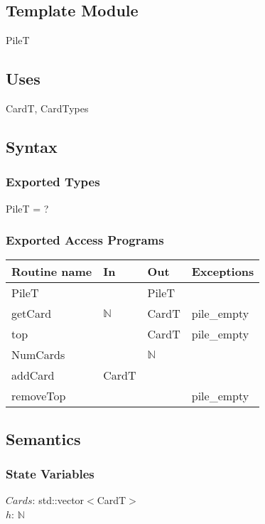 \documentclass[12pt]{article}
\begin{document}
\subsection*{Template Module}

PileT

\subsection* {Uses}

CardT, CardTypes

\subsection* {Syntax}

\subsubsection* {Exported Types}

PileT = ?

\subsubsection* {Exported Access Programs}

\begin{tabular}{| l | l | l | l |}
\hline
\textbf{Routine name} & \textbf{In} & \textbf{Out} & \textbf{Exceptions}\\
\hline
PileT & ~ & PileT & ~\\
\hline
getCard & $\mathbb{N}$ & CardT & pile\_empty\\
\hline
top & ~ & CardT & pile\_empty\\
\hline
NumCards & ~ & $\mathbb{N}$ & ~\\
\hline
addCard & CardT & ~ & ~\\
\hline
removeTop & ~ & ~ & pile\_empty\\
\hline
\end{tabular}

\subsection* {Semantics}

\subsubsection* {State Variables}

$Cards$: std::vector$<$CardT$>$\\
$h$: $\mathbb{N}$\\
\end{document}
